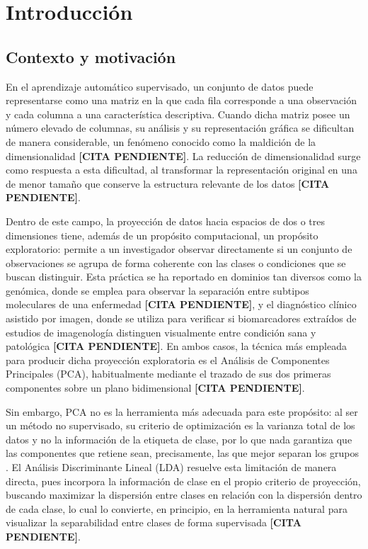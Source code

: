 	
	\chapter{Introducción}
	\label{chap:introduccion}
	
	\section{Contexto y motivación}
	\label{sec:Contexto-Motivación}
	
	En el aprendizaje automático supervisado, un conjunto de datos puede representarse como una matriz en la que cada fila corresponde a una observación y cada columna a una característica descriptiva. Cuando dicha matriz posee un número elevado de columnas, su análisis y su representación gráfica se dificultan de manera considerable, un fenómeno conocido como la maldición de la dimensionalidad \textbf{[CITA PENDIENTE]}. La reducción de dimensionalidad surge como respuesta a esta dificultad, al transformar la representación original en una de menor tamaño que conserve la estructura relevante de los datos \textbf{[CITA PENDIENTE]}.
	
	Dentro de este campo, la proyección de datos hacia espacios de dos o tres dimensiones tiene, además de un propósito computacional, un propósito exploratorio: permite a un investigador observar directamente si un conjunto de observaciones se agrupa de forma coherente con las clases o condiciones que se buscan distinguir. Esta práctica se ha reportado en dominios tan diversos como la genómica, donde se emplea para observar la separación entre subtipos moleculares de una enfermedad \textbf{[CITA PENDIENTE]}, y el diagnóstico clínico asistido por imagen, donde se utiliza para verificar si biomarcadores extraídos de estudios de imagenología distinguen visualmente entre condición sana y patológica \textbf{[CITA PENDIENTE]}. En ambos casos, la técnica más empleada para producir dicha proyección exploratoria es el Análisis de Componentes Principales (PCA), habitualmente mediante el trazado de sus dos primeras componentes sobre un plano bidimensional \textbf{[CITA PENDIENTE]}.
	
	Sin embargo, PCA no es la herramienta más adecuada para este propósito: al ser un método no supervisado, su criterio de optimización es la varianza total de los datos y no la información de la etiqueta de clase, por lo que nada garantiza que las componentes que retiene sean, precisamente, las que mejor separan los grupos \cite{hastie2009elements}. El Análisis Discriminante Lineal (LDA) resuelve esta limitación de manera directa, pues incorpora la información de clase en el propio criterio de proyección, buscando maximizar la dispersión entre clases en relación con la dispersión dentro de cada clase, lo cual lo convierte, en principio, en la herramienta natural para visualizar la separabilidad entre clases de forma supervisada \textbf{[CITA PENDIENTE]}.
	
